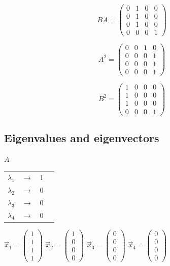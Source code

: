 \documentclass[12pt]{scrreprt}
\begin{document}
\[ BA = \left( \begin{array}{cccc}
0 & 1 & 0 & 0 \\
0 & 1 & 0 & 0 \\
0 & 1 & 0 & 0 \\
0 & 0 & 0 & 1 \end{array} \right)\] 

\[ A^2 = \left( \begin{array}{ccccc}
0 & 0 & 1 & 0 \\
0 & 0 & 0 & 1 \\
0 & 0 & 0 & 1 \\
0 & 0 & 0 & 1 \end{array} \right)\] 

\[ B^2 = \left( \begin{array}{ccccc}
1 & 0 & 0 & 0 \\
1 & 0 & 0 & 0 \\
1 & 0 & 0 & 0 \\
0 & 0 & 0 & 1 \end{array} \right)\] 

\subsection{Eigenvalues and eigenvectors}

  \begin{center}
  \textbf{$A$}
  \end{center}

  \begin{center}
  \begin{tabular}{ c c c p{5cm} }
    $\lambda_1$ & $\rightarrow$ & 1 \\        
    $\lambda_2$ & $\rightarrow$ & 0 \\
    $\lambda_3$ & $\rightarrow$ & 0 \\
    $\lambda_4$ & $\rightarrow$ & 0 \\
  \end{tabular}
  \end{center}

  \begin{center}
  $\vec{x}_1 = \begin{pmatrix}1\\ 1 \\ 1 \\ 1 \end{pmatrix}$
  $\vec{x}_2 = \begin{pmatrix}1\\ 0 \\ 0 \\ 0 \end{pmatrix}$
  $\vec{x}_3 = \begin{pmatrix}0\\ 0 \\ 0 \\ 0 \end{pmatrix}$
  $\vec{x}_4 = \begin{pmatrix}0\\ 0 \\ 0 \\ 0 \end{pmatrix}$
  \end{center}
\end{document}
